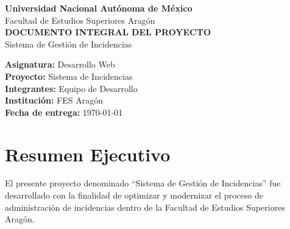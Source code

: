 \documentclass[12pt,letterpaper,oneside]{extreport}
\begin{document}
\begin{titlepage}

\centering

\vspace*{1.5cm}

{\Huge \textbf{Universidad Nacional Autónoma de México}}\\[0.8cm]

{\LARGE Facultad de Estudios Superiores Aragón}\\[1.8cm]

{\Huge \textbf{DOCUMENTO INTEGRAL DEL PROYECTO}}\\[1.2cm]

{\Huge Sistema de Gestión de Incidencias}\\[2cm]

\begin{flushleft}

\Large

\textbf{Asignatura:} Desarrollo Web\\[0.5cm]

\textbf{Proyecto:} Sistema de Incidencias\\[0.5cm]

\textbf{Integrantes:} Equipo de Desarrollo\\[0.5cm]

\textbf{Institución:} FES Aragón\\[0.5cm]

\textbf{Fecha de entrega:} \today

\end{flushleft}

\vfill

\end{titlepage}

\tableofcontents
\newpage

\chapter{Resumen Ejecutivo}

El presente proyecto denominado ``Sistema de Gestión de Incidencias'' fue desarrollado con la finalidad de optimizar y modernizar el proceso de administración de incidencias dentro de la Facultad de Estudios Superiores Aragón.
\end{document}
